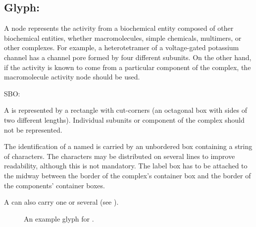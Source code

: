 \subsection{Glyph: }
\label{sec:af:complex}

A  node represents the activity from a biochemical entity composed of other biochemical entities, whether macromolecules, simple chemicals, multimers, or other complexes. For example, a heterotetramer of a voltage-gated potassium channel has a channel pore formed by four different subunits. On the other hand, if the activity is known to come from a particular component of the complex, the macromolecule activity node should be used.

\begin{glyphDescription}

\glyphSboTerm SBO:

\glyphContainer A  is represented by a rectangle with cut-corners (an octagonal box with sides of two different lengths).  Individual subunits or component of the complex should not be represented.

\glyphLabel The identification of a named  is carried by an unbordered box containing a string of characters.  The characters may be distributed on several lines to improve readability, although this is not mandatory.  The label box has to be attached to the midway between the border of the complex's container box and the border of the components' container boxes.

\glyphAux  A  can also carry one or several  (see ).

\end{glyphDescription}

\begin{figure}[H]
  \centering
  \caption{An example \AF glyph for .}
  \label{fig:af:complex}
\end{figure}
